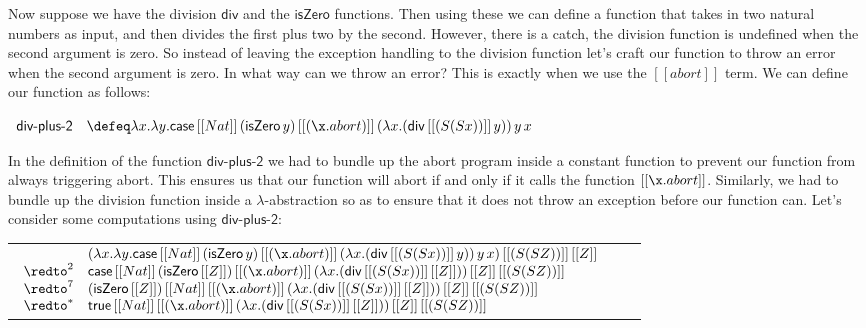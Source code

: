 \begin{example}
  Now suppose we have the division $\mathsf{div}$ and the
  $\mathsf{isZero}$ functions.  Then using these we can define a
  function that takes in two natural numbers as input, and then divides
  the first plus two by the second.  However, there is a catch, the
  division function is undefined when the second argument is zero.  So
  instead of leaving the exception handling to the division function
  let's craft our function to throw an error when the second argument
  is zero.  In what way can we throw an error?  This is exactly when
  we use the $[[abort]]$ term.  We can define our function as follows:
  \begin{center}
    \small
    \begin{math}
      \begin{array}{lll}
        \textsf{div-plus-2} & \defeq
        \lambda x.\lambda y.\mathsf{case}\,[[Nat]]\,(\mathsf{isZero}\,y)\,[[(\x.abort)]]\,(\lambda x.(\mathsf{div}\,[[(S (S x))]]\,y))\,y\,x        
      \end{array}
    \end{math}
  \end{center}
  In the definition of the function $\textsf{div-plus-2}$ we had to
  bundle up the abort program inside a constant function to prevent
  our function from always triggering abort.  This ensures us that our
  function will abort if and only if it calls the function
  $[[\x.abort]]$.  Similarly, we had to bundle up the division
  function inside a $\lambda$-abstraction so as to ensure that it does
  not throw an exception before our function can.  Let's consider some
  computations using $\textsf{div-plus-2}$:
  \begin{center}
    \small
    \begin{tabular}{lll}
      \begin{math}
      \begin{array}{lll}
                 & (\lambda x.\lambda y.\mathsf{case}\,[[Nat]]\,(\mathsf{isZero}\,y)\,[[(\x.abort)]]\,(\lambda x.(\mathsf{div}\,[[(S (S x))]]\,y))\,y\,x)\,[[(S (S Z))]]\,[[Z]] \\
        \redto^2 & \mathsf{case}\,[[Nat]]\,(\mathsf{isZero}\,[[Z]])\,[[(\x.abort)]]\,(\lambda x.(\mathsf{div}\,[[(S (S x))]]\,[[Z]]))\,[[Z]]\,[[(S (S Z))]] \\
        \redto^7 & (\mathsf{isZero}\,[[Z]])\,[[Nat]]\,[[(\x.abort)]]\,(\lambda x.(\mathsf{div}\,[[(S (S x))]]\,[[Z]]))\,[[Z]]\,[[(S (S Z))]] \\
        \redto^* & \mathsf{true}\,[[Nat]]\,[[(\x.abort)]]\,(\lambda x.(\mathsf{div}\,[[(S (S x))]]\,[[Z]]))\,[[Z]]\,[[(S (S Z))]] \\

\end{array}
\end{math}
\end{tabular}
\end{center}
\end{example}
